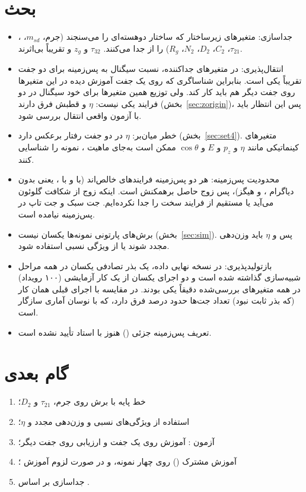 \section{بحث}
\label{sec:disc}
\begin{itemize}
\item جداسازی: متغیرهای زیرساختار که ساختار دو‌هسته‌ای را می‌سنجند (جرم، $m_{sd}$، ، $\tau_{21}$، $C_2$، $D_2$، $N_2$، $R_g$)  را از \bb جدا می‌کنند. $\tau_{32}$ و $z_g$ و \pt تقریباً بی‌اثرند.
\item انتقال‌پذیری: در متغیرهای جداکننده، نسبت سیگنال به پس‌زمینه برای دو جفت تقریباً یکی است. بنابراین شناساگری که روی یک جفت آموزش دیده در این متغیرها روی جفت دیگر هم باید کار کند. ولی توزیع همین متغیرها برای خود سیگنال در دو فرایند یکی نیست: $\eta$ و قطبش \Zbos{} فرق دارند (بخش~\ref{sec:zorigin})، پس این انتظار باید با آزمون واقعی انتقال بررسی شود.
\item خطر میان‌بر: $\eta$ در دو جفت رفتار برعکس دارد (بخش~\ref{sec:set4}). متغیرهای کینماتیکی مانند $\eta$ و $p_z$ و $E$ و $\cos\theta$ ممکن است به‌جای ماهیت \Zbos{}، نمونه را شناسایی کنند.
\item محدودیت پس‌زمینه: هر دو پس‌زمینه فرایندهای  خالص‌اند (\bbbb با  و \ttbb با ، یعنی بدون دیاگرام \Zbos{}، \lr{$\gamma^*$} و هیگز)، پس زوج \bb حاصل برهمکنش  است. اینکه زوج از شکافت گلوئون می‌آید یا مستقیم از فرایند سخت را جدا نکرده‌ایم. جت سبک و جت تاپ در پس‌زمینه نیامده است.
\item برش‌های پارتونی نمونه‌ها یکسان نیست (بخش~\ref{sec:sim}). پس \pt و $\eta$ باید وزن‌دهی مجدد شوند یا از ویژگی نسبی استفاده شود.
\item بازتولیدپذیری: در نسخه نهایی داده، یک بذر تصادفی یکسان در همه مراحل شبیه‌سازی گذاشته شده است و دو اجرای یکسان از یک کار آزمایشی (۱۰۰ رویداد) در همه متغیرهای بررسی‌شده دقیقاً یکی بودند. در مقایسه با اجرای قبلی همان کار (که بذر  ثابت نبود) تعداد جت‌ها حدود  درصد فرق دارد، که با نوسان آماری سازگار است.
\item تعریف پس‌زمینه جزئی () هنوز با استاد تأیید نشده است.
\end{itemize}

\section{گام بعدی}
\label{sec:next}
\begin{enumerate}
\item خط پایه با برش روی جرم، $\tau_{21}$ و $D_2$؛
\item استفاده از ویژگی‌های نسبی و وزن‌دهی مجدد \pt و $\eta$؛
\item آزمون : آموزش روی یک جفت و ارزیابی روی جفت دیگر؛
\item آموزش مشترک () روی چهار نمونه، و در صورت لزوم آموزش ؛
\item جداسازی  بر اساس .
\end{enumerate}
